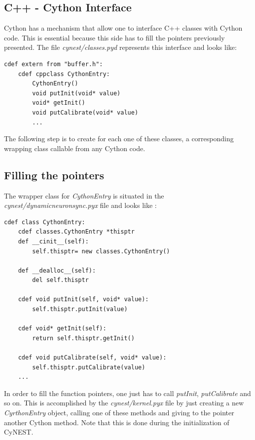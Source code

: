 \documentclass{article}
\begin{document}
\subsection{C++ - Cython Interface}
Cython has a mechanism that allow one to interface C++ classes with Cython code. This is essential because this side has to fill the pointers previously presented.
The file \emph{cynest/classes.pyd} represents this interface and looks like:
\begin{verbatim}
cdef extern from "buffer.h":
    cdef cppclass CythonEntry:
        CythonEntry()
        void putInit(void* value)
        void* getInit()
        void putCalibrate(void* value)
        ...
\end{verbatim}
The following step is to create for each one of these classes, a corresponding wrapping class callable from any Cython code.
\subsection{Filling the pointers}
The wrapper class for \emph{CythonEntry} is situated in the \emph{cynest/dynamicneuronsync.pyx} file and looks like :
\begin{verbatim}
cdef class CythonEntry:
    cdef classes.CythonEntry *thisptr
    def __cinit__(self):
        self.thisptr= new classes.CythonEntry()
        
    def __dealloc__(self):
        del self.thisptr

    cdef void putInit(self, void* value):
        self.thisptr.putInit(value)
    
    cdef void* getInit(self):
        return self.thisptr.getInit()

    cdef void putCalibrate(self, void* value):
        self.thisptr.putCalibrate(value)
    ...
\end{verbatim}
In order to fill the function pointers, one just has to call \emph{putInit}, \emph{putCalibrate} and so on. This is accomplished by the \emph{cynest/kernel.pyx} file by just creating a new \emph{CyrthonEntry} object, calling one of these methods and giving to the pointer another Cython method. Note that this is done during the initialization of CyNEST.
\end{document}
